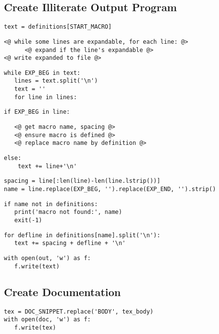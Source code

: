\documentclass{article}
\begin{document}
\subsection{Create Illiterate Output Program}

{\color{YellowOrange}\begin{verbatim}text = definitions[START_MACRO]
\end{verbatim}}{\color{MidnightBlue}\begin{verbatim}<@ while some lines are expandable, for each line: @>
      <@ expand if the line's expandable @>
<@ write expanded to file @>
\end{verbatim}}
{\color{YellowOrange}\begin{verbatim}while EXP_BEG in text:
   lines = text.split('\n')
   text = ''
   for line in lines:
\end{verbatim}}{\color{YellowOrange}\begin{verbatim}if EXP_BEG in line:
\end{verbatim}}{\color{MidnightBlue}\begin{verbatim}   <@ get macro name, spacing @>
   <@ ensure macro is defined @>
   <@ replace macro name by definition @>
\end{verbatim}}
{\color{YellowOrange}\begin{verbatim}else:
    text += line+'\n'
\end{verbatim}}{\color{YellowOrange}\begin{verbatim}spacing = line[:len(line)-len(line.lstrip())]
name = line.replace(EXP_BEG, '').replace(EXP_END, '').strip()
\end{verbatim}}{\color{YellowOrange}\begin{verbatim}if name not in definitions:
   print('macro not found:', name)
   exit(-1)
\end{verbatim}}{\color{YellowOrange}\begin{verbatim}for defline in definitions[name].split('\n'):
   text += spacing + defline + '\n'
\end{verbatim}}{\color{YellowOrange}\begin{verbatim}with open(out, 'w') as f:
   f.write(text)
\end{verbatim}}\subsection{Create Documentation}

{\color{YellowOrange}\begin{verbatim}tex = DOC_SNIPPET.replace('BODY', tex_body)
with open(doc, 'w') as f:
   f.write(tex)
\end{verbatim}}
\end{document}
